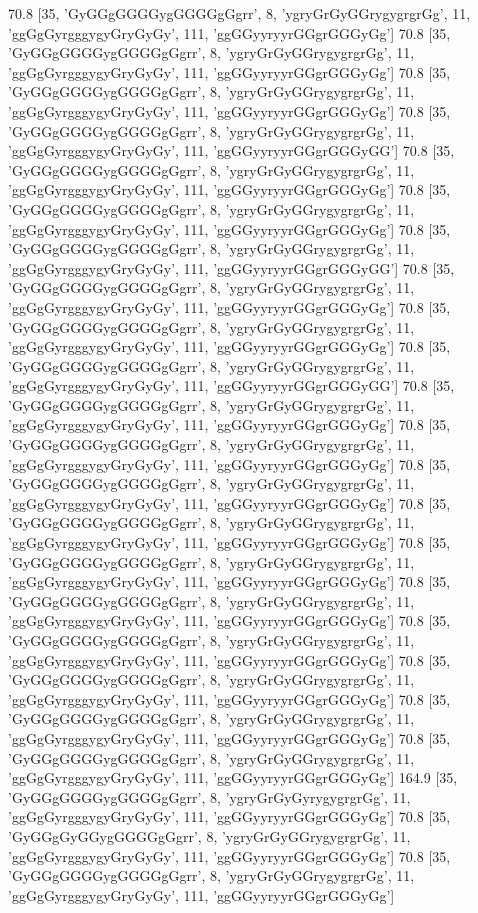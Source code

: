 70.8 [35, 'GyGGgGGGGygGGGGgGgrr', 8, 'ygryGrGyGGrygygrgrGg', 11, 'ggGgGyrgggygyGryGyGy', 111, 'ggGGyyryyrGGgrGGGyGg']
70.8 [35, 'GyGGgGGGGygGGGGgGgrr', 8, 'ygryGrGyGGrygygrgrGg', 11, 'ggGgGyrgggygyGryGyGy', 111, 'ggGGyyryyrGGgrGGGyGg']
70.8 [35, 'GyGGgGGGGygGGGGgGgrr', 8, 'ygryGrGyGGrygygrgrGg', 11, 'ggGgGyrgggygyGryGyGy', 111, 'ggGGyyryyrGGgrGGGyGg']
70.8 [35, 'GyGGgGGGGygGGGGgGgrr', 8, 'ygryGrGyGGrygygrgrGg', 11, 'ggGgGyrgggygyGryGyGy', 111, 'ggGGyyryyrGGgrGGGyGG']
70.8 [35, 'GyGGgGGGGygGGGGgGgrr', 8, 'ygryGrGyGGrygygrgrGg', 11, 'ggGgGyrgggygyGryGyGy', 111, 'ggGGyyryyrGGgrGGGyGg']
70.8 [35, 'GyGGgGGGGygGGGGgGgrr', 8, 'ygryGrGyGGrygygrgrGg', 11, 'ggGgGyrgggygyGryGyGy', 111, 'ggGGyyryyrGGgrGGGyGg']
70.8 [35, 'GyGGgGGGGygGGGGgGgrr', 8, 'ygryGrGyGGrygygrgrGg', 11, 'ggGgGyrgggygyGryGyGy', 111, 'ggGGyyryyrGGgrGGGyGG']
70.8 [35, 'GyGGgGGGGygGGGGgGgrr', 8, 'ygryGrGyGGrygygrgrGg', 11, 'ggGgGyrgggygyGryGyGy', 111, 'ggGGyyryyrGGgrGGGyGg']
70.8 [35, 'GyGGgGGGGygGGGGgGgrr', 8, 'ygryGrGyGGrygygrgrGg', 11, 'ggGgGyrgggygyGryGyGy', 111, 'ggGGyyryyrGGgrGGGyGg']
70.8 [35, 'GyGGgGGGGygGGGGgGgrr', 8, 'ygryGrGyGGrygygrgrGg', 11, 'ggGgGyrgggygyGryGyGy', 111, 'ggGGyyryyrGGgrGGGyGG']
70.8 [35, 'GyGGgGGGGygGGGGgGgrr', 8, 'ygryGrGyGGrygygrgrGg', 11, 'ggGgGyrgggygyGryGyGy', 111, 'ggGGyyryyrGGgrGGGyGg']
70.8 [35, 'GyGGgGGGGygGGGGgGgrr', 8, 'ygryGrGyGGrygygrgrGg', 11, 'ggGgGyrgggygyGryGyGy', 111, 'ggGGyyryyrGGgrGGGyGg']
70.8 [35, 'GyGGgGGGGygGGGGgGgrr', 8, 'ygryGrGyGGrygygrgrGg', 11, 'ggGgGyrgggygyGryGyGy', 111, 'ggGGyyryyrGGgrGGGyGg']
70.8 [35, 'GyGGgGGGGygGGGGgGgrr', 8, 'ygryGrGyGGrygygrgrGg', 11, 'ggGgGyrgggygyGryGyGy', 111, 'ggGGyyryyrGGgrGGGyGg']
70.8 [35, 'GyGGgGGGGygGGGGgGgrr', 8, 'ygryGrGyGGrygygrgrGg', 11, 'ggGgGyrgggygyGryGyGy', 111, 'ggGGyyryyrGGgrGGGyGg']
70.8 [35, 'GyGGgGGGGygGGGGgGgrr', 8, 'ygryGrGyGGrygygrgrGg', 11, 'ggGgGyrgggygyGryGyGy', 111, 'ggGGyyryyrGGgrGGGyGg']
70.8 [35, 'GyGGgGGGGygGGGGgGgrr', 8, 'ygryGrGyGGrygygrgrGg', 11, 'ggGgGyrgggygyGryGyGy', 111, 'ggGGyyryyrGGgrGGGyGg']
70.8 [35, 'GyGGgGGGGygGGGGgGgrr', 8, 'ygryGrGyGGrygygrgrGg', 11, 'ggGgGyrgggygyGryGyGy', 111, 'ggGGyyryyrGGgrGGGyGg']
70.8 [35, 'GyGGgGGGGygGGGGgGgrr', 8, 'ygryGrGyGGrygygrgrGg', 11, 'ggGgGyrgggygyGryGyGy', 111, 'ggGGyyryyrGGgrGGGyGg']
70.8 [35, 'GyGGgGGGGygGGGGgGgrr', 8, 'ygryGrGyGGrygygrgrGg', 11, 'ggGgGyrgggygyGryGyGy', 111, 'ggGGyyryyrGGgrGGGyGg']
164.9 [35, 'GyGGgGGGGygGGGGgGgrr', 8, 'ygryGrGyGyrygygrgrGg', 11, 'ggGgGyrgggygyGryGyGy', 111, 'ggGGyyryyrGGgrGGGyGg']
70.8 [35, 'GyGGgGyGGygGGGGgGgrr', 8, 'ygryGrGyGGrygygrgrGg', 11, 'ggGgGyrgggygyGryGyGy', 111, 'ggGGyyryyrGGgrGGGyGg']
70.8 [35, 'GyGGgGGGGygGGGGgGgrr', 8, 'ygryGrGyGGrygygrgrGg', 11, 'ggGgGyrgggygyGryGyGy', 111, 'ggGGyyryyrGGgrGGGyGg']
